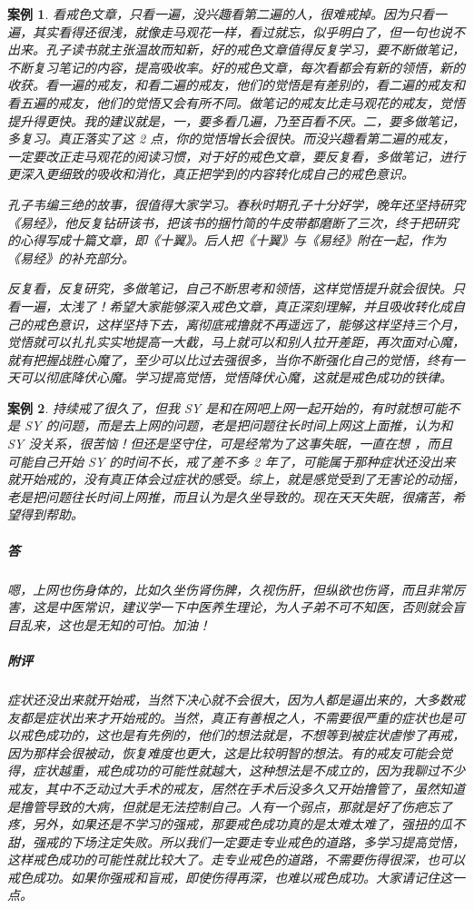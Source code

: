 \documentclass{ctexart}
\newtheorem{case}{案例}
\begin{document}
\begin{case}
    看戒色文章，只看一遍，没兴趣看第二遍的人，很难戒掉。因为只看一遍，其实看得还很浅，就像走马观花一样，看过就忘，似乎明白了，但一句也说不出来。孔子读书就主张温故而知新，好的戒色文章值得反复学习，要不断做笔记，不断复习笔记的内容，提高吸收率。好的戒色文章，每次看都会有新的领悟，新的收获。看一遍的戒友，和看二遍的戒友，他们的觉悟是有差别的，看二遍的戒友和看五遍的戒友，他们的觉悟又会有所不同。做笔记的戒友比走马观花的戒友，觉悟提升得更快。我的建议就是，一，要多看几遍，乃至百看不厌。二，要多做笔记，多复习。真正落实了这 2 点，你的觉悟增长会很快。而没兴趣看第二遍的戒友，一定要改正走马观花的阅读习惯，对于好的戒色文章，要反复看，多做笔记，进行更深入更细致的吸收和消化，真正把学到的内容转化成自己的戒色意识。

    孔子韦编三绝的故事，很值得大家学习。春秋时期孔子十分好学，晚年还坚持研究《易经》，他反复钻研该书，把该书的捆竹简的牛皮带都磨断了三次，终于把研究的心得写成十篇文章，即《十翼》。后人把《十翼》与《易经》附在一起，作为《易经》的补充部分。

    反复看，反复研究，多做笔记，自己不断思考和领悟，这样觉悟提升就会很快。只看一遍，太浅了！希望大家能够深入戒色文章，真正深刻理解，并且吸收转化成自己的戒色意识，这样坚持下去，离彻底戒撸就不再遥远了，能够这样坚持三个月，觉悟就可以扎扎实实地提高一大截，马上就可以和别人拉开差距，再次面对心魔，就有把握战胜心魔了，至少可以比过去强很多，当你不断强化自己的觉悟，终有一天可以彻底降伏心魔。学习提高觉悟，觉悟降伏心魔，这就是戒色成功的铁律。
\end{case}

\begin{case}
    持续戒了很久了，但我 SY 是和在网吧上网一起开始的，有时就想可能不是 SY 的问题，而是去上网的问题，老是把问题往长时间上网这上面推，认为和 SY 没关系，很苦恼！但还是坚守住，可是经常为了这事失眠，一直在想 ，而且可能自己开始 SY 的时间不长，戒了差不多 2 年了，可能属于那种症状还没出来就开始戒的，没有真正体会过症状的感受。综上，就是感觉受到了无害论的动摇，老是把问题往长时间上网推，而且认为是久坐导致的。现在天天失眠，很痛苦，希望得到帮助。
    \subparagraph{答} 嗯，上网也伤身体的，比如久坐伤肾伤脾，久视伤肝，但纵欲也伤肾，而且非常厉害，这是中医常识，建议学一下中医养生理论，为人子弟不可不知医，否则就会盲目乱来，这也是无知的可怕。加油！
    \subparagraph{附评} 症状还没出来就开始戒，当然下决心就不会很大，因为人都是逼出来的，大多数戒友都是症状出来才开始戒的。当然，真正有善根之人，不需要很严重的症状也是可以戒色成功的，这也是有先例的，他们的想法就是，不想等到被症状虐惨了再戒，因为那样会很被动，恢复难度也更大，这是比较明智的想法。有的戒友可能会觉得，症状越重，戒色成功的可能性就越大，这种想法是不成立的，因为我聊过不少戒友，其中不乏动过大手术的戒友，居然在手术后没多久又开始撸管了，虽然知道是撸管导致的大病，但就是无法控制自己。人有一个弱点，那就是好了伤疤忘了疼，另外，如果还是不学习的强戒，那要戒色成功真的是太难太难了，强扭的瓜不甜，强戒的下场注定失败。所以我们一定要走专业戒色的道路，多学习提高觉悟，这样戒色成功的可能性就比较大了。走专业戒色的道路，不需要伤得很深，也可以戒色成功。如果你强戒和盲戒，即使伤得再深，也难以戒色成功。大家请记住这一点。
\end{case}
\end{document}
